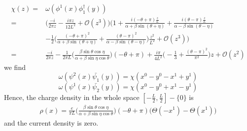 \begin{equation*}
\begin{split} 
\chi(z) = & \omega(\phi^1(x) \phi^\dagger_1(y)) \\
= & \Big(  \frac{-i}{2 \pi z} - \frac{i \pi z}{12L^2} + \mathcal{O}(z^3) \Big)  \bigg( 1 + \frac{i(-\theta + \pi)\frac{z}{L}}{\alpha + \beta\sin(\theta + \eta)}  
+ \frac{ i (\theta - \pi) \frac{z}{L}}{\alpha - \beta\sin(\theta - \eta)}   \\
& - \frac{1}{2}\Big(\frac{(-\theta + \pi)^2}{\alpha + \beta \sin (\theta + \eta)}  
+ \frac{(\theta - \pi)^2}{\alpha - \beta \sin (\theta - \eta)} \Big)\frac{z^2}{L^2}
+ \mathcal{O}(z^3) \bigg)  \\
= & \frac{-i}{2 \pi z} - \frac{1}{2\pi L} \Big( \frac{\beta \sin \theta \cos \eta}{\alpha + \beta \sin \eta \cos \theta}\Big) (-\theta + \pi) 
+ \frac{i\pi}{4 L^2}\big( -\frac{1}{3} + \frac{(\theta - \pi)^2}{\pi^2}\big)z
+ \mathcal{O}(z^2)
\end{split}
\end{equation*}
we find
\begin{equation*}
\omega(\psi^2(x) \bar{\psi_1}(y)) = \chi(x^0 - y^0 - x^1 + y^1)
\end{equation*}
\begin{equation*}
\omega(\psi^1(x) \bar{\psi_2}(y)) = \chi(x^0 - y^0 + x^1 - y^1)
\end{equation*}
Hence, the charge density in the whole space $[-\frac{L}{2}, \frac{L}{2}] - \{0\}$ is
\begin{equation}\label{vacuum-density_without_field}
\begin{split}
\rho(x) = \frac{e}{\pi L}\Big( \frac{\beta \sin \theta \cos \eta}{\alpha + \beta \sin \eta \cos \theta}\Big) (-\theta + \pi) \Big( \Theta(-x^1) - \Theta(x^1)\Big)
\end{split}
\end{equation}
and the current density is zero. 
